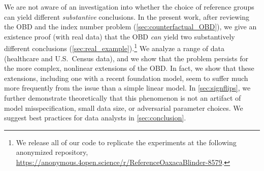 We are not aware of an investigation into whether the choice of reference groups can yield different \emph{substantive} conclusions.
In the present work, after reviewing the OBD and the index number problem (\cref{sec:counterfactual_OBD}), we 
give an existence proof (with real data) that the OBD \emph{can} yield two substantively different conclusions (\cref{sec:real_example}).\footnote{We release all of our code to replicate the experiments at the following anonymized repository, \url{https://anonymous.4open.science/r/ReferenceOaxacaBlinder-8579}.}%
We analyze a range of data (healthcare and U.S.\ Census data), and we show that the problem persists for the more complex, nonlinear extensions of the OBD.
In fact, we show that these extensions, including one with a recent foundation model, seem to suffer much more frequently from the issue than
a simple linear model.
In \cref{sec:signflips}, we further demonstrate theoretically that this phenomenon is not an artifact of 
model misspecification, small data size, or adversarial parameter choices.
We suggest best practices for data analysts in \cref{sec:conclusion}.












